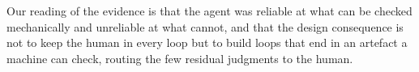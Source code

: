 Our reading of the evidence is that the agent was reliable at what can be checked mechanically and
unreliable at what cannot, and that the design consequence is not to keep the human in every loop
but to build loops that end in an artefact a machine can check, routing the few residual
judgments to the human.
